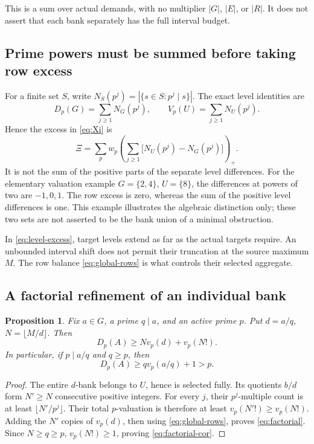 \documentclass[11pt,a4paper]{article}
\newtheorem{proposition}[theorem]{Proposition}
\theoremstyle{remark}
\begin{document}
This is a sum over actual demands, with no multiplier \(|G|\),
\(|E|\), or \(|R|\). It does not assert that each bank separately
has the full interval budget.

\subsection{Prime powers must be summed before taking row excess}

For a finite set \(S\), write
\(N_S(p^j)=|\{s\in S:p^j\mid s\}|\). The exact level identities are
\[
 D_p(G)=\sum_{j\ge1}N_G(p^j),\qquad
 V_p(U)=\sum_{j\ge1}N_U(p^j).
\]
Hence the excess in \eqref{eq:Xi} is
\begin{equation}
 \Xi=\sum_p w_p
 \left(\sum_{j\ge1}\bigl[N_U(p^j)-N_G(p^j)\bigr]\right)_+.
 \label{eq:level-excess}
\end{equation}
It is not the sum of the positive parts of the separate level
differences. For the elementary valuation example
\(G=\{2,4\}\), \(U=\{8\}\), the differences at powers of two are
\(-1,0,1\). The row excess is zero, whereas the sum of the
positive level differences is one. This example illustrates the
algebraic distinction only; these two sets are not asserted to be
the bank union of a minimal obstruction.

In \eqref{eq:level-excess}, target levels extend as far as the actual
targets require. An unbounded interval shift does not permit their
truncation at the source maximum \(M\). The row balance
\eqref{eq:global-rows} is what controls their selected aggregate.

\subsection{A factorial refinement of an individual bank}

\begin{proposition}
\label{prop:factorial}
Fix \(a\in G\), a prime \(q\mid a\), and an active prime \(p\).
Put \(d=a/q\), \(N=\lfloor M/d\rfloor\). Then
\begin{equation}
 D_p(A)\ge N v_p(d)+v_p(N!).
 \label{eq:factorial}
\end{equation}
In particular, if \(p\mid a/q\) and \(q\ge p\), then
\begin{equation}
 D_p(A)\ge qv_p(a/q)+1>p.
 \label{eq:factorial-cor}
\end{equation}
\end{proposition}

\begin{proof}
The entire \(d\)-bank belongs to \(U\), hence is selected fully.
Its quotients \(b/d\) form \(N'\ge N\) consecutive positive integers.
For every \(j\), their \(p^j\)-multiple count is at least
\(\lfloor N'/p^j\rfloor\). Their total \(p\)-valuation is therefore
at least \(v_p(N'!)\ge v_p(N!)\). Adding the \(N'\) copies of
\(v_p(d)\), then using \eqref{eq:global-rows}, proves
\eqref{eq:factorial}. Since \(N\ge q\ge p\),
\(v_p(N!)\ge1\), proving \eqref{eq:factorial-cor}.
\end{proof}
\end{document}
